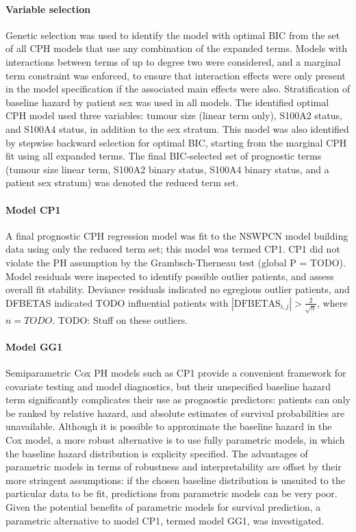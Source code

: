 \documentclass[dissertation.tex]{subfiles}
\begin{document}
\paragraph{Variable selection}
Genetic selection was used to identify the model with optimal \gls{BIC} from the set of all \gls{CPH} models that use any combination of the expanded terms.  Models with interactions between terms of up to degree two were considered, and a marginal term constraint was enforced, to ensure that interaction effects were only present in the model specification if the associated main effects were also.  Stratification of baseline hazard by patient sex was used in all models.  The identified optimal \gls{CPH} model used three variables: tumour size (linear term only), S100A2 status, and S100A4 status, in addition to the sex stratum.  This model was also identified by stepwise backward selection for optimal BIC, starting from the marginal \gls{CPH} fit using all expanded terms.  The final \gls{BIC}-selected set of prognostic terms (tumour size linear term, S100A2 binary status, S100A4 binary status, and a patient sex stratum) was denoted the reduced term set.

\paragraph{Model CP1}
A final prognostic \acrshort{CPH} regression model was fit to the \gls{NSWPCN} model building data using only the reduced term set; this model was termed CP1.  CP1 did not violate the \gls{PH} assumption by the Grambsch-Therneau test (global P = TODO).  Model residuals were inspected to identify possible outlier patients, and assess overall fit stability.  Deviance residuals indicated no egregious outlier patients, and DFBETAS indicated TODO influential patients with $|\mbox{DFBETAS}_{i,j}| > \frac{2}{\sqrt{n}}$, where $n = TODO$.  TODO: Stuff on these outliers.

\paragraph{Model GG1}
Semiparametric Cox \gls{PH} models such as CP1 provide a convenient framework for covariate testing and model diagnostics, but their unspecified baseline hazard term significantly complicates their use as prognostic predictors: patients can only be ranked by relative hazard, and absolute estimates of survival probabilities are unavailable.  Although it is possible to approximate the baseline hazard in the Cox model, a more robust alternative is to use fully parametric models, in which the baseline hazard distribution is explicity specified.  The advantages of parametric models in terms of robustness and interpretability are offset by their more stringent assumptions: if the chosen baseline distribution is unsuited to the particular data to be fit, predictions from parametric models can be very poor.  Given the potential benefits of parametric models for survival prediction, a parametric alternative to model CP1, termed model GG1, was investigated.
\end{document}
